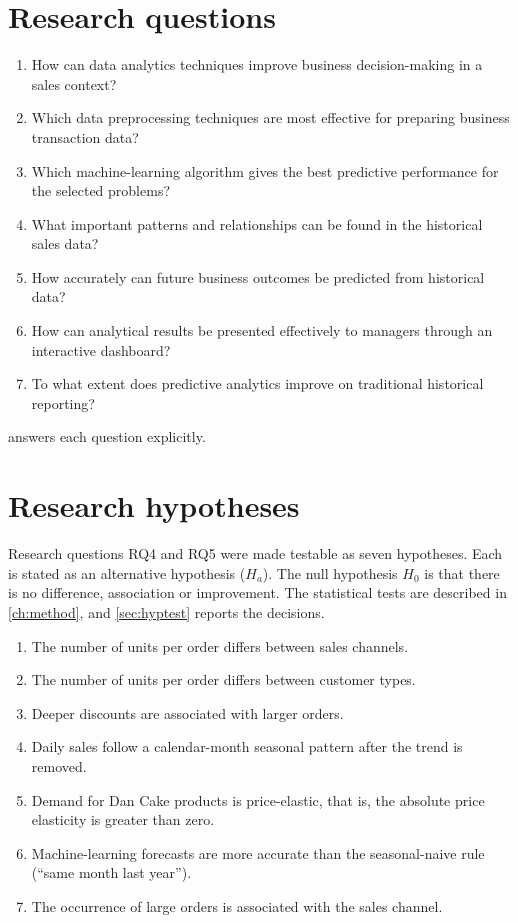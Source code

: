\section{Research questions}
\begin{enumerate}[label=RQ\arabic*.]
  \item How can data analytics techniques improve business decision-making in a sales context?
  \item Which data preprocessing techniques are most effective for preparing business transaction data?
  \item Which machine-learning algorithm gives the best predictive performance for the selected problems?
  \item What important patterns and relationships can be found in the historical sales data?
  \item How accurately can future business outcomes be predicted from historical data?
  \item How can analytical results be presented effectively to managers through an interactive dashboard?
  \item To what extent does predictive analytics improve on traditional historical reporting?
\end{enumerate}
 answers each question explicitly.

\section{Research hypotheses}\label{sec:hypotheses}
Research questions RQ4 and RQ5 were made testable as seven hypotheses. Each is stated as an alternative
hypothesis ($H_a$). The null hypothesis $H_0$ is that there is no difference, association or improvement. The
statistical tests are described in \cref{ch:method}, and \cref{sec:hyptest} reports the decisions.
\begin{enumerate}[label=H\arabic*.]
  \item The number of units per order differs between sales channels.
  \item The number of units per order differs between customer types.
  \item Deeper discounts are associated with larger orders.
  \item Daily sales follow a calendar-month seasonal pattern after the trend is removed.
  \item Demand for Dan Cake products is price-elastic, that is, the absolute price elasticity is greater than zero.
  \item Machine-learning forecasts are more accurate than the seasonal-naive rule (``same month last year'').
  \item The occurrence of large orders is associated with the sales channel.
\end{enumerate}

